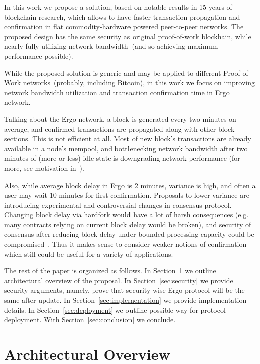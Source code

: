\documentclass{llncs}
\begin{document}
In this work we propose a solution, based on notable results in 15 years of blockchain research, which allows to have
faster transaction propagation and confirmation in flat commodity-hardware powered peer-to-peer networks. The proposed design
has the same security as original proof-of-work blockhain, while nearly fully utilizing network bandwidth~(and so achieving
maximum performance possible).

While the proposed solution is generic and may be applied to different Proof-of-Work networks~(probably, including
Bitcoin), in this work we focus on improving network bandwidth utilization and transaction confirmation time in Ergo network.

Talking about the Ergo network, a block is generated every two minutes on average, and confirmed transactions are propagated along with
other block sections. This is not efficient at all. Most of new block's transactions are already available in a node's mempool, and
bottlenecking network bandwidth after two minutes of (more or less) idle state is downgrading network performance (for
more, see motivation in~\cite{eyal2016bitcoinng}).

Also, while average block delay in Ergo is 2 minutes, variance is high, and often a user may wait 10 minutes for
first confirmation. Proposals to lower variance are introducing experimental and controversial changes in consensus protocol.
Changing block delay via hardfork would have a lot of harsh consequences (e.g. many contracts relying on current block
delay would be broken), and security of consensus after reducing block delay under bounded processing capacity could be
compromised~\cite{kiffer2024nakamoto}. Thus it makes sense to consider weaker notions of confirmation which still could be useful for
a variety of applications.

The rest of the paper is organized as follows. In Section~\ref{sec:architectural-overview} we outline architectural overview of the proposal. In
Section~\ref{sec:security} we provide security arguments, namely, prove that security-wise Ergo protocol will be the same after update.
In Section~\ref{sec:implementation} we provide implementation details. In Section~\ref{sec:deployment} we outline possible way for
protocol deployment. With Section~\ref{sec:conclusion} we conclude.


\section{Architectural Overview}
\label{sec:architectural-overview}
\end{document}
